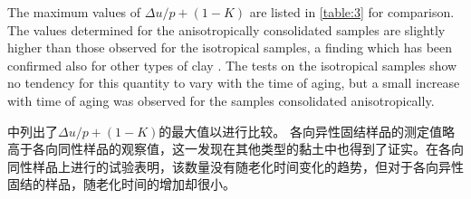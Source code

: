 

\begin{paracol}{2}
    

    The maximum values of $\Delta{u}/p+(1-K)$ are listed in \autoref{table:3} for comparison. The values determined for the anisotropically consolidated samples are slightly higher than those observed for the isotropical samples, a finding which has been confirmed also for other types of clay \citep{Bjerrum196123b}. The tests on the isotropical samples show no tendency for this quantity to vary with the time of aging, but a small increase with time of aging was observed for the samples consolidated anisotropically.

    \switchcolumn

    中列出了$\Delta{u}/p+(1-K)$的最大值以进行比较。 各向异性固结样品的测定值略高于各向同性样品的观察值，这一发现在其他类型的黏土中也得到了证实\citep{Bjerrum196123b}。在各向同性样品上进行的试验表明，该数量没有随老化时间变化的趋势，但对于各向异性固结的样品，随老化时间的增加却很小。

\end{paracol}